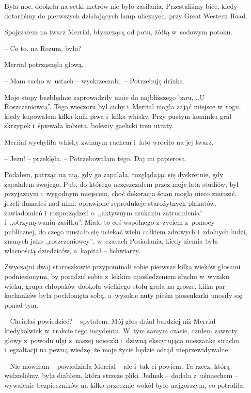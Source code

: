 \documentclass[oneside,polish,11pt,sfheadings]{mwbk}
\begin{document}
Była noc, dookoła na setki metrów nie było zasilania. Przestaliśmy biec,
kiedy dotarliśmy do pierwszych działających lamp ulicznych, przy Great
Western Road.

Spojrzałem na twarz Merrial, błyszczącą od potu, żółtą w~sodowym potoku.

-- Co to, na Rozum, było?

Merrial potrząsnęła głową. 

-- Mam sucho w~ustach -- wyskrzeczała. -- Potrzebuję drinka.

Moje stopy bezbłędnie zaprowadziły mnie do najbliższego baru, ,,U
Roszczeniowca''. Tego wieczoru był cichy i~Merrial mogła zająć miejsce w~rogu, kiedy kupowałem kilka kufli piwa i~kilka whisky. Przy pustym
kominku grał skrzypek i~śpiewała kobieta, bolesny gaelicki tren utraty.

Merrial wychyliła whisky zwinnym ruchem i~lato wróciło na jej twarz.

-- Jezu! -- przeklęła. -- Potrzebowałam tego. Daj mi papierosa.

Podałem, patrząc na nią, gdy go zapalała, rozglądając się dyskretnie,
gdy zapalałem swojego. Pub, do którego uczęszczałem przez moje lata
studiów, był przyjaznym i~wygodnym miejscem, choć dekoracja ścian mogła
nieco zmrozić, jeżeli dumałeś nad nimi: oprawione reprodukcje
starożytnych plakatów, zawiadomień i~rozporządzeń o~,,aktywnym szukaniu
zatrudnienia'' i~,,otrzymywaniu zasiłku''. Miało to coś wspólnego z~życiem z~pomocy publicznej, do czego musiało się uciekać wielu całkiem
zdrowych i~zdolnych ludzi, znanych jako ,,roszczeniowcy'', w~czasach
Posiadania, kiedy ziemia była własnością dziedziców, a~kapitał -- lichwiarzy.

Zwyczajni dwaj staruszkowie przypominali sobie pierwsze kilka wieków
głosami podniesionymi, by poradzić sobie z~lekkim upośledzeniem słuchu w~wyniku wieku, grupa chłopaków dookoła wielkiego stołu grała na grosze,
kilka par kochanków była pochłonięta sobą, a~wysokie nuty pieśni
piosenkarki unosiły się ponad tym.

-- Chciałaś powiedzieć? -- spytałem. Mój głos drżał bardziej niż Merrial
kiedykolwiek w~trakcie tego incydentu. W~tym samym czasie, czułem
zawroty głowy z~powodu ulgi z~naszej ucieczki i~dziwną ekscytującą
mieszankę strachu i~egzaltacji na pewną wiedzę, że moje życie będzie
odtąd nieprzewidywalne.

-- Nie mówiłam -- powiedziała Merrial -- ale i~tak ci powiem. Ta rzecz,
którą widzieliśmy, była diabłem, która strzeże pliki. Jednak -- dodała z~uśmiechem -- wywalenie bezpieczników na kilka przecznic wokół było
najgorszym, co potrafiła.
\end{document}
